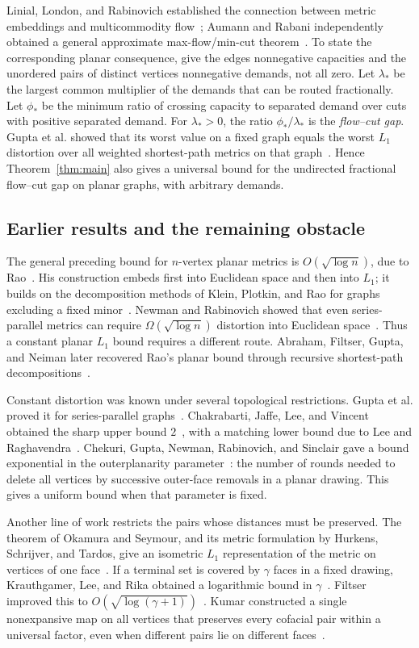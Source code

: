 Linial, London, and Rabinovich established the connection between
metric embeddings and multicommodity flow~\cite{LLR95}; Aumann and
Rabani independently obtained a general approximate max-flow/min-cut
theorem~\cite{AR98}. To state the corresponding planar consequence,
give the edges nonnegative capacities and the unordered pairs of
distinct vertices nonnegative demands, not all zero. Let $\lambda_*$
be the largest common multiplier of the demands that can be routed
fractionally. Let $\phi_*$ be the minimum ratio of crossing capacity
to separated demand over cuts with positive separated demand. For
$\lambda_*>0$, the ratio $\phi_*/\lambda_*$ is the \emph{flow--cut gap}.
Gupta et al. showed that its worst value on a fixed graph equals the
worst $L_1$ distortion over all weighted shortest-path metrics on that
graph~\cite[Section~3, Theorem~3.2]{GNRS04}. Hence
Theorem~\ref{thm:main} also gives a universal bound for the undirected
fractional flow--cut gap on planar graphs, with arbitrary demands.

\subsection{Earlier results and the remaining obstacle}

The general preceding bound for $n$-vertex planar metrics is
$O(\sqrt{\log n})$, due to Rao~\cite{Rao99}. His construction embeds
first into Euclidean space and then into $L_1$; it builds on the
decomposition methods of Klein, Plotkin, and Rao for graphs excluding
a fixed minor~\cite{KPR93}. Newman and Rabinovich showed that even
series-parallel metrics can require $\Omega(\sqrt{\log n})$ distortion
into Euclidean space~\cite{NR03}. Thus a constant planar $L_1$ bound
requires a different route. Abraham, Filtser, Gupta, and Neiman later
recovered Rao's planar bound through recursive shortest-path
decompositions~\cite{AFGN22}.

Constant distortion was known under several topological restrictions.
Gupta et al. proved it for series-parallel graphs~\cite{GNRS04}.
Chakrabarti, Jaffe, Lee, and Vincent obtained the sharp upper bound
$2$~\cite{CJLV08}, with a matching lower bound due to Lee and
Raghavendra~\cite{LR10}. Chekuri, Gupta, Newman, Rabinovich, and
Sinclair gave a bound exponential in the outerplanarity
parameter~\cite{CGNRS06}: the number of rounds needed to delete all
vertices by successive outer-face removals in a planar drawing.
This gives a uniform bound when that parameter is fixed.

Another line of work restricts the pairs whose distances must be
preserved. The theorem of Okamura and Seymour, and its metric
formulation by Hurkens, Schrijver, and Tardos, give an isometric
$L_1$ representation of the metric on vertices of one
face~\cite{OS81,HST88}. If a terminal set is covered by $\gamma$
faces in a fixed drawing, Krauthgamer, Lee, and Rika obtained a
logarithmic bound in $\gamma$~\cite{KLR19}. Filtser improved this to
$O(\sqrt{\log(\gamma+1)})$~\cite{Filtser25}. Kumar constructed a
single nonexpansive map on all vertices that preserves every
cofacial pair within a universal factor, even when different pairs
lie on different faces~\cite{Kumar25}.

